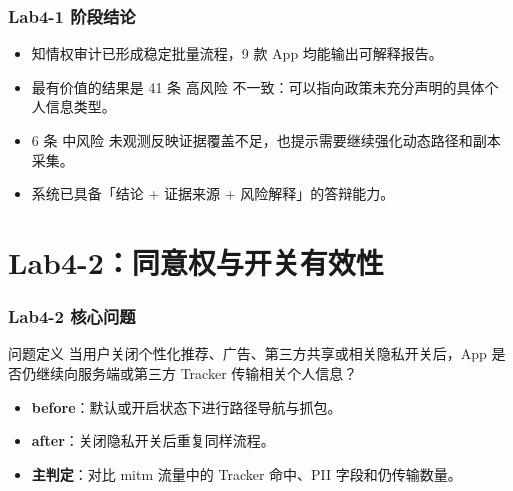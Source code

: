 \documentclass[AutoFakeBold,AutoFakeSlant]{beamer}
\newcommand{\riskhigh}{\textcolor{red!70!black}{高风险}}
\newcommand{\riskmid}{\textcolor{orange!80!black}{中风险}}
\begin{document}
\begin{frame}
    \frametitle{Lab4-1 阶段结论}
    \small
    \begin{itemize}
        \item 知情权审计已形成稳定批量流程，9 款 App 均能输出可解释报告。
        \item 最有价值的结果是 41 条 \riskhigh{} 不一致：可以指向政策未充分声明的具体个人信息类型。
        \item 6 条 \riskmid{} 未观测反映证据覆盖不足，也提示需要继续强化动态路径和副本采集。
        \item 系统已具备「结论 + 证据来源 + 风险解释」的答辩能力。
    \end{itemize}
\end{frame}

\section{Lab4-2：同意权与开关有效性}

\begin{frame}
    \frametitle{Lab4-2 核心问题}
    \small
    \begin{block}{问题定义}
        当用户关闭个性化推荐、广告、第三方共享或相关隐私开关后，App 是否仍继续向服务端或第三方 Tracker 传输相关个人信息？
    \end{block}
    \begin{itemize}
        \item \textbf{before}：默认或开启状态下进行路径导航与抓包。
        \item \textbf{after}：关闭隐私开关后重复同样流程。
        \item \textbf{主判定}：对比 mitm 流量中的 Tracker 命中、PII 字段和仍传输数量。
    \end{itemize}
\end{frame}
\end{document}
